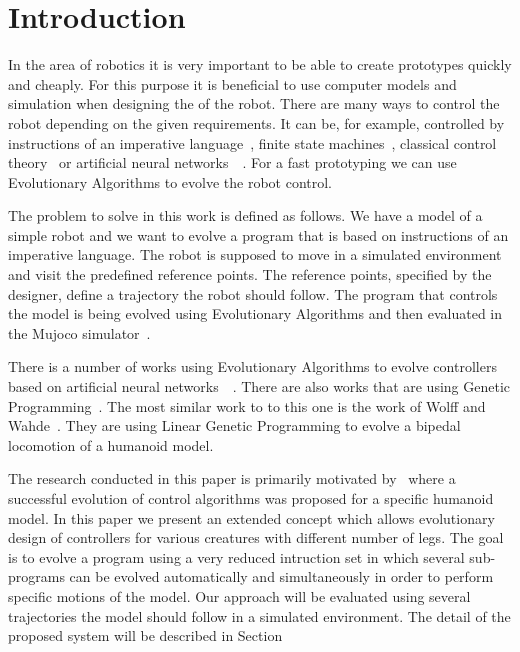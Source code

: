 \documentclass{ExcelAtFIT}
\affiliation{*%
  \href{mailto:xfajku06@stud.fit.vutbr.cz}{xfajku06@stud.fit.vutbr.cz},
  \textit{Faculty of Information Technology, Brno University of Technology}}
\begin{document}
\startdocument



\section{Introduction}
In the area of robotics it is very important to be able to create prototypes quickly and cheaply.
For this purpose it is beneficial to use computer models and simulation when designing the  of the robot.
There are many ways to control the robot depending on the given requirements.
It can be, for example, controlled by instructions of an imperative language~\cite{Wolff2007}, finite state machines~\cite{Hodgins1996}, classical control theory~\cite{Mita1984} or artificial neural networks~\cite{Reil2002}~\cite{Lewis1996}.
For a fast prototyping we can use Evolutionary Algorithms to evolve the robot control.

The problem to solve in this work is defined as follows.
We have a model of a simple robot and we want to evolve a program that is based on instructions of an imperative language.
The robot is supposed to move in a simulated environment and visit the predefined reference points.
The reference points, specified by the designer, define a trajectory the robot should follow.
The program that controls the model is being evolved using Evolutionary Algorithms and then evaluated in the Mujoco simulator~\cite{Todorov2012}.

There is a number of works using Evolutionary Algorithms to evolve controllers based on artificial neural networks~\cite{Randall1992}~\cite{Farooq2013}.
There are also works that are using Genetic Programming~\cite{Macedo2017}.
The most similar work to to this one is the work of Wolff and Wahde~\cite{Wolff2007}.
They are using Linear Genetic Programming to evolve a bipedal locomotion of a humanoid model.

The research conducted in this paper is primarily motivated by~\cite{Wolff2007} where a successful evolution of
control algorithms was proposed for a specific humanoid model. In this paper we present an extended concept which allows evolutionary
design of controllers for various creatures with different number of legs. The goal is to evolve a program using a very reduced intruction
set in which several sub-programs can be evolved automatically and simultaneously in order to perform specific motions of the model.
Our approach will be evaluated using several trajectories the model should follow in a simulated environment. The detail of the proposed
system will be described in Section 
\end{document}
